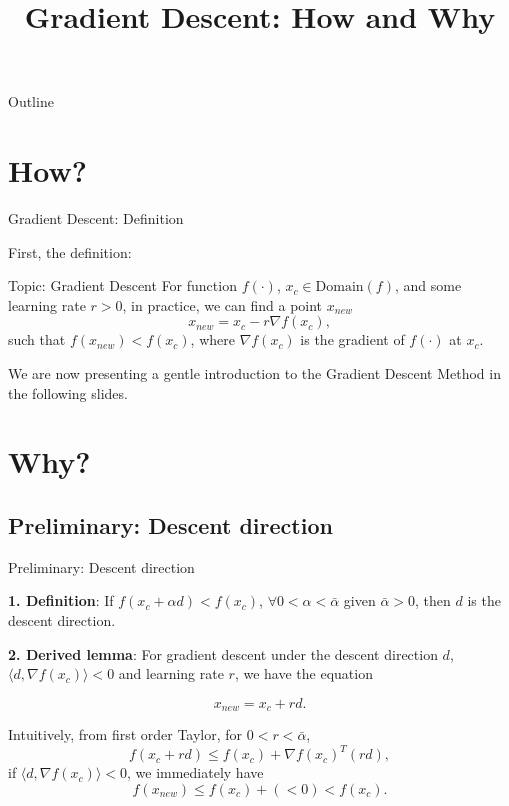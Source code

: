 \documentclass[9pt,handout]{beamer}
\title{Gradient Descent: How and Why}
\begin{document}
{
\beamertemplatenavigationsymbolsempty
\begin{frame}[plain]
\titlepage
\end{frame}
}


\begin{frame}{Outline} 
\tableofcontents 
\end{frame} 

\addtocounter{framenumber}{-2}
\section{How?}

\begin{frame}{Gradient Descent: Definition}

First, the definition:

\begin{block}{Topic: Gradient Descent}
	 For function $f(\cdot)$, $x_c\in\text{Domain}(f)$, and some learning rate $r>0$, in practice, we can find a point $x_{new}$
	$$x_{new}=x_c-r\nabla f(x_c),$$
	such that $f(x_{new})<f(x_c)$, where $\nabla f(x_c)$ is the gradient of $f(\cdot)$ at $x_c$.
\end{block}

We are now presenting a gentle introduction to the Gradient Descent Method in the following slides.

\end{frame}

\addtocounter{framenumber}{-2}
\section{Why?}
\subsection{Preliminary: Descent direction}

\begin{frame}{Preliminary: Descent direction }

\noindent \textbf{1. Definition}: If $f(x_c+\alpha d)<f(x_c)$, $\forall 0<\alpha < \bar\alpha$ given $\bar\alpha>0$, then $d$ is the descent direction.

\noindent \textbf{2. Derived lemma}: For gradient descent under the descent direction $d$, $\langle d, \nabla f(x_c)\rangle<0$ and learning rate $r$, we have the equation

$$x_{new} = x_c + r d.$$

Intuitively, from first order Taylor, for $0<r < \bar\alpha$,
$$f(x_c+r d) \le f(x_c) + \nabla f(x_c)^T(r d),$$
if $\langle d, \nabla f(x_c)\rangle<0$, we immediately have
$$f(x_{new}) \le f(x_c)+(<0)<f(x_c).$$

\end{frame}
\end{document}
